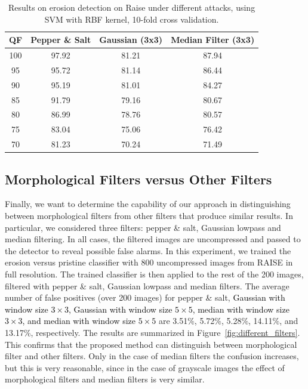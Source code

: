 \documentclass{ieeeaccess}
\newcommand{\revisedtext}[1]{\textcolor{black}{#1}}
\begin{document}
\begin{table}[t!]
	\centering
	\caption{Results on erosion detection on Raise under different attacks, using SVM with RBF kernel, 10-fold cross validation.}
	\label{table:attacks2}
	\begin{tabular}{c|ccc}
		\hline\hline
		\textbf{QF} & \textbf{Pepper \& Salt}&\textbf{Gaussian (3x3)}&\textbf{Median Filter (3x3)}\\
		\hline
		100&97.92&81.21&87.94\\
		95&95.72&81.14&86.44\\
		90&95.19&81.01&84.27\\
		85&91.79&79.16&80.67\\
		80&86.99&78.76&80.57\\
		75&83.04&75.06&76.42\\
		70&81.23&70.24&71.49\\
		\hline\hline	
	\end{tabular}
\end{table}

\subsection{Morphological Filters versus Other Filters }
\label{subsec:results_different_filters}

Finally, we want to determine the capability of our approach in distinguishing between morphological filters from other filters that produce similar results. In particular, we considered three filters: pepper \& salt, Gaussian lowpass and median filtering. In all cases, the filtered images are uncompressed and passed to the detector to reveal possible false alarms. 
In this experiment, we trained the erosion versus pristine classifier with 800 uncompressed images from RAISE in full resolution. The trained classifier is then applied to the rest of the 200 images, filtered with pepper \& salt, Gaussian lowpass and median filters. The average number of false positives (over 200 images) for pepper \& salt, \revisedtext{ Gaussian with window size $3 \times 3$, Gaussian with window size $5 \times 5$, median with window size $3 \times 3$, and median with window size $5 \times 5$} are 3.51\%, 5.72\%, 5.28\%, 14.11\%, and 13.17\%, respectively. The results are summarized in Figure~\ref{fig:different_filters}.  
This confirms that the proposed method can distinguish between morphological filter and other filters. Only in the case of median filters the confusion increases, but this is very reasonable, since in the case of grayscale images the effect of morphological filters and median filters is very similar.
\end{document}
